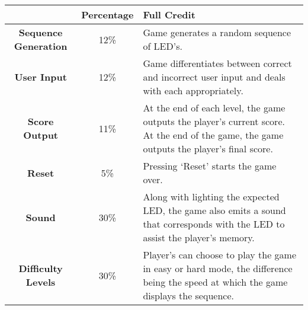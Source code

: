 \documentclass[]{article}
\begin{document}
\begin{table}[H]
\centering
\begin{tabular}{c | c | p{5.22cm}}
& \textbf{Percentage} & \textbf{Full Credit}\\\hline
\textbf{Sequence Generation}  & 12\% & Game generates a random sequence of LED's.\\\hline
\textbf{User Input}  &  12\% & Game differentiates between correct and incorrect user input and deals with each appropriately.\\\hline
\textbf{Score Output} &  11\% & At the end of each level, the game outputs the player's current score. At the end of the game, the game outputs the player's final score.\\\hline
\textbf{Reset} &  5\% & Pressing `Reset' starts the game over.\\\hline
\textbf{Sound} & 30\% & Along with lighting the expected LED, the game also emits a sound that corresponds with the LED to assist the player's memory.\\\hline
\textbf{Difficulty Levels} & 30\% & Player's can choose to play the game in easy or hard mode, the difference being the speed at which the game displays the sequence.\\\hline
\end{tabular}

\end{table}
\end{document}
